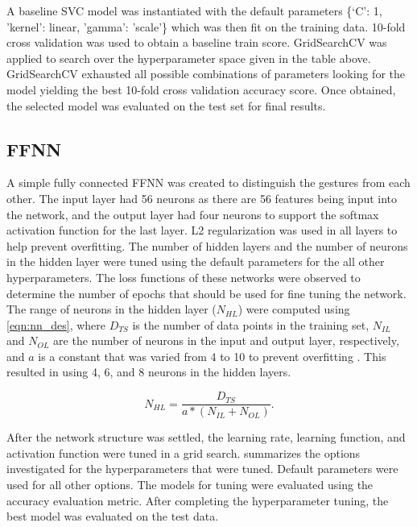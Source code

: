 \documentclass[journal]{IEEEtran}
\begin{document}
A baseline SVC model was instantiated with the default parameters \{‘C’: 1, 'kernel': linear, 'gamma': 'scale'\} which was then fit on the training data. 10-fold cross validation was used to obtain a baseline train score. GridSearchCV was applied to search over the hyperparameter space given in the table above. GridSearchCV exhausted all possible combinations of parameters looking for the model yielding the best 10-fold cross validation accuracy score. Once obtained, the selected model was evaluated on the test set for final results.

\subsection{FFNN}
A simple fully connected FFNN was created to distinguish the gestures from each other. The input layer had 56 neurons as there are 56 features being input into the network, and the output layer had four neurons to support the softmax activation function for the last layer. L2 regularization was used in all layers to help prevent overfitting. The number of hidden layers and the number of neurons in the hidden layer were tuned using the default parameters for the all other hyperparameters. The loss functions of these networks were observed to determine the number of epochs that should be used for fine tuning the network. The range of neurons in the hidden layer ($N_{HL}$) were computed using \cref{eqn:nn_des}, where $D_{TS}$ is the number of data points in the training set, $N_{IL}$ and $N_{OL}$ are the number of neurons in the input and output layer, respectively, and $a$ is a constant that was varied from 4 to 10 to prevent overfitting \cite{demuth2014}. This resulted in using 4, 6, and 8 neurons in the hidden layers.

\begin{equation}
N_{HL}=\frac{D_{TS}}{a*(N_{IL}+N_{OL})}.
\label{eqn:nn_des}
\end{equation}

After the network structure was settled, the learning rate, learning function, and activation function were tuned in a grid search.  summarizes the options investigated for the hyperparameters that were tuned. Default parameters were used for all other options. The models for tuning were evaluated using the accuracy evaluation metric. After completing the hyperparameter tuning, the best model was evaluated on the test data. 
\end{document}
